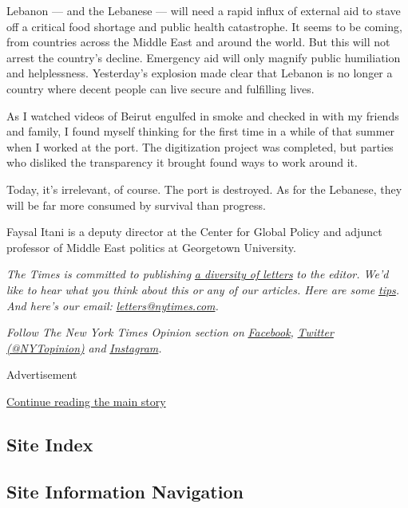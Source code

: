 Lebanon --- and the Lebanese --- will need a rapid influx of external
aid to stave off a critical food shortage and public health catastrophe.
It seems to be coming, from countries across the Middle East and around
the world. But this will not arrest the country's decline. Emergency aid
will only magnify public humiliation and helplessness. Yesterday's
explosion made clear that Lebanon is no longer a country where decent
people can live secure and fulfilling lives.

As I watched videos of Beirut engulfed in smoke and checked in with my
friends and family, I found myself thinking for the first time in a
while of that summer when I worked at the port. The digitization project
was completed, but parties who disliked the transparency it brought
found ways to work around it.

Today, it's irrelevant, of course. The port is destroyed. As for the
Lebanese, they will be far more consumed by survival than progress.

Faysal Itani is a deputy director at the Center for Global Policy and
adjunct professor of Middle East politics at Georgetown University.

\emph{The Times is committed to publishing}
\href{https://www.nytimes.com/2019/01/31/opinion/letters/letters-to-editor-new-york-times-women.html}{\emph{a
diversity of letters}} \emph{to the editor. We'd like to hear what you
think about this or any of our articles. Here are some}
\href{https://help.nytimes.com/hc/en-us/articles/115014925288-How-to-submit-a-letter-to-the-editor}{\emph{tips}}\emph{.
And here's our email:}
\href{mailto:letters@nytimes.com}{\emph{letters@nytimes.com}}\emph{.}

\emph{Follow The New York Times Opinion section on}
\href{https://www.facebook.com/nytopinion}{\emph{Facebook}}\emph{,}
\href{http://twitter.com/NYTOpinion}{\emph{Twitter (@NYTopinion)}}
\emph{and}
\href{https://www.instagram.com/nytopinion/}{\emph{Instagram}}\emph{.}

Advertisement

\protect\hyperlink{after-bottom}{Continue reading the main story}

\hypertarget{site-index}{%
\subsection{Site Index}\label{site-index}}

\hypertarget{site-information-navigation}{%
\subsection{Site Information
Navigation}\label{site-information-navigation}}

